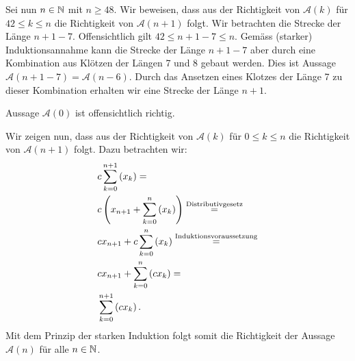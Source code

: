 \begin{myanswer}[myexercise:0210]
\begin{aenum}
		Sei nun $n\in\mathbb{N}$ mit $n\geq 48$. Wir beweisen, dass aus der Richtigkeit von $\mathcal{A}(k)$ für $42\leq k \leq n$ die Richtigkeit von $\mathcal{A}(n+1)$ folgt. Wir betrachten die Strecke der Länge $n+1-7$. Offensichtlich gilt $42\leq n+1-7\leq n$. Gemäss (starker) Induktionsannahme kann die Strecke der Länge $n+1-7$ aber durch eine Kombination aus Klötzen der Längen 7 und 8 gebaut werden. Dies ist Aussage $\mathcal{A}(n+1-7) = \mathcal{A}(n-6)$. Durch das Ansetzen eines Klotzes der Länge 7 zu dieser Kombination erhalten wir eine Strecke der Länge $n+1$.
	\end{aenum}
\end{myanswer}
\clearpage
\begin{myanswer}[myexercise:0295]
	Aussage $\mathcal{A}(0)$ ist offensichtlich richtig.

	Wir zeigen nun, dass aus der Richtigkeit von $\mathcal{A}(k)$ für $0\leq k\leq n$ die Richtigkeit von $\mathcal{A}(n+1)$ folgt. Dazu betrachten wir:
	\begin{align*}
		 & c\sum_{k=0}^{n+1}\left(x_k\right) =                                                     \\
		 & c\left(x_{n+1} + \sum_{k=0}^{n}\left(x_k\right)\right) \stackrel{\text{Distributivgesetz}}{=}   \\
		 & cx_{n+1} + c\sum_{k=0}^{n}\left(x_k\right) \stackrel{\text{Induktionsvoraussetzung}}{=} \\
		 & cx_{n+1} + \sum_{k=0}^{n}\left(cx_k\right) =                                            \\
		 & \sum_{k=0}^{n+1}\left(cx_k\right).
	\end{align*}
	Mit dem Prinzip der starken Induktion folgt somit die Richtigkeit der Aussage $\mathcal{A}(n)$ für alle $n\in\mathbb{N}$.
\end{myanswer}
